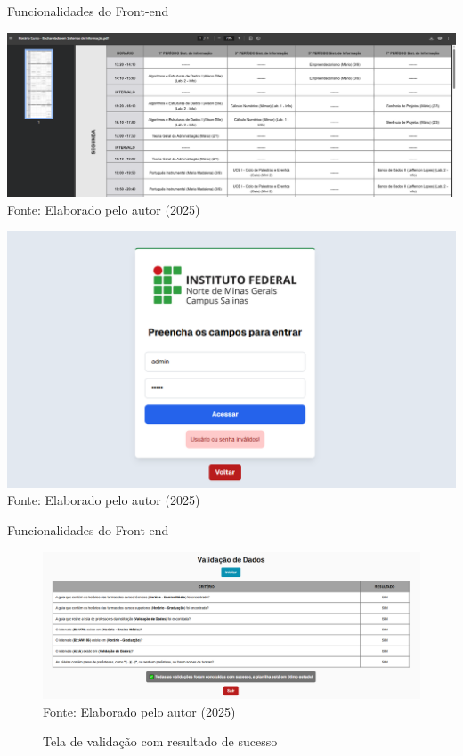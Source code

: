 \begin{frame}{Funcionalidades do Front-end}
    \begin{minipage}{0.48\textwidth}
        \centering
        \includegraphics[width=1\textwidth]{figuras/front-20.png}
        \small Fonte: Elaborado pelo autor (2025)
    \end{minipage}
    \hfill
    \begin{minipage}{0.48\textwidth}
        \centering
        \includegraphics[width=1\textwidth]{figuras/front-21.png}
        \small Fonte: Elaborado pelo autor (2025)
    \end{minipage}
\end{frame}

\begin{frame}{Funcionalidades do Front-end}
    \begin{figure}
        \centering
        \vspace{-0.5cm}
        \caption{Tela de validação com resultado de sucesso}
        \vspace{-0.2cm}
        \includegraphics[width=1\textwidth]{figuras/front-22.png}
        \\ %
        \small Fonte: Elaborado pelo autor (2025)
    \end{figure}
\end{frame}

